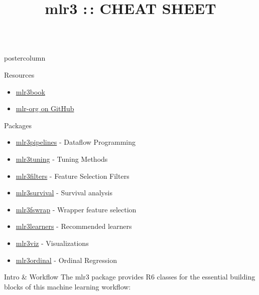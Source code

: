 \documentclass{beamer}
\title{mlr3 :\,: CHEAT SHEET} %
\newlength{\columnheight} %
\begin{document}
\begin{frame}[fragile]{}
\begin{columns}
	\begin{column}{.245\textwidth}
		\begin{beamercolorbox}[center]{postercolumn}
			\begin{minipage}{.98\textwidth}
				\parbox[t][\columnheight]{\textwidth}{
					\begin{myblock}{Resources}
						\begin{itemize}
							\item \href{https://mlr3book.mlr-org.com/index.html}{mlr3book}
							\item \href{https://github.com/mlr-org}{mlr-org on GitHub} 
						\end{itemize}
					\end{myblock}
						\begin{myblock}{Packages}
										\vfill
						\begin{itemize}
							\item \href{https://github.com/mlr-org/mlr3pipelines}{mlr3pipelines} - Dataflow Programming
							\item \href{https://github.com/mlr-org/mlr3tuning}{mlr3tuning} - Tuning Methods
							\item \href{https://github.com/mlr-org/mlr3filters}{mlr3filters} - Feature Selection Filters
							\item \href{https://github.com/mlr-org/mlr3survival}{mlr3survival} - Survival analysis
							\item \href{https://github.com/mlr-org/mlr3fswrap}{mlr3fswrap} - Wrapper feature selection
							\item \href{https://github.com/mlr-org/mlr3learners}{mlr3learners} - Recommended learners
							\item \href{https://github.com/mlr-org/mlr3viz}{mlr3viz} - Visualizations
							\item \href{https://github.com/mlr-org/mlr3ordinal}{mlr3ordinal} - Ordinal Regression
						\end{itemize}
					\end{myblock}

					\begin{myblock}{Intro \& Workflow}
					The mlr3 package provides R6 classes for the essential building
					blocks of this machine learning workflow:


\end{myblock}}
\end{minipage}
\end{beamercolorbox}
\end{column}
\end{columns}
\end{frame}
\end{document}
